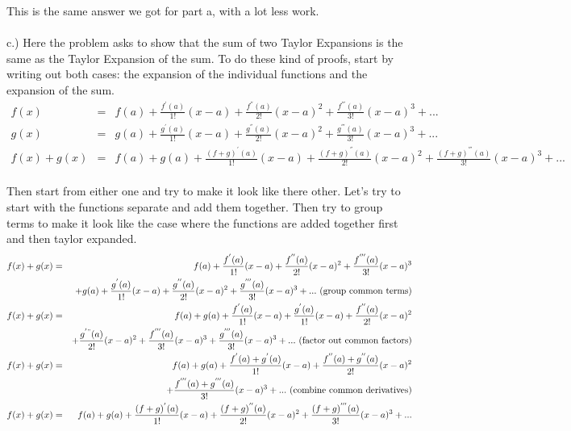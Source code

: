 \documentclass[11pt]{amsart}
\begin{document}
This is the same answer we got for part a, with a lot less work. \\ \\ 
c.) Here the problem asks to show that the sum of two Taylor Expansions is the same as the Taylor Expansion of the sum. To do these kind of proofs, start by writing out both cases: the expansion of the individual functions and the expansion of the sum. \\
\begin{eqnarray} 
f(x) &=& f(a) + \frac{f^{'}(a)}{1!} (x-a) + \frac{f^{''}(a)}{2!}(x-a)^{2} + \frac{f^{'''}(a)}{3!}(x-a)^{3} + ... \nonumber \\
g(x) &=& g(a) + \frac{g^{'}(a)}{1!} (x-a) + \frac{g^{''}(a)}{2!}(x-a)^{2} + \frac{g^{'''}(a)}{3!}(x-a)^{3} + ... \nonumber \\
f(x) + g(x) &=& f(a) + g(a) + \frac{(f+g)^{'}(a)}{1!} (x-a) + \frac{(f+g)^{''}(a)}{2!}(x-a)^{2} + \frac{(f+g)^{'''}(a)}{3!}(x-a)^{3} + ... \nonumber
\end{eqnarray} \\
Then start from either one and try to make it look like there other. Let's try to start with the functions separate and add them together. Then try to group terms to make it look like the case where the functions are added together first and then taylor expanded. \\ 
\begin{eqnarray*} 
f(x) + g(x) &=& f(a) + \frac{f^{'}(a)}{1!} (x-a) + \frac{f^{''}(a)}{2!}(x-a)^{2} + \frac{f^{'''}(a)}{3!}(x-a)^{3}  \\ 
                 & & +  g(a) + \frac{g^{'}(a)}{1!} (x-a) + \frac{g^{''}(a)}{2!}(x-a)^{2} + \frac{g^{'''}(a)}{3!}(x-a)^{3} + ...  \mbox{ (group common terms)}  \\ 
f(x) + g(x)  &=& f(a) + g(a) + \frac{f^{'}(a)}{1!} (x-a) + \frac{g^{'}(a)}{1!} (x-a) + \frac{f^{''}(a)}{2!}(x-a)^{2} \\
                  & & + \frac{g^{'"}(a)}{2!} (x-a)^{2} + \frac{f^{'''}(a)}{3!}(x-a)^{3} + \frac{g^{'''}(a)}{3!}(x-a)^{3} + ... \mbox{ (factor out common factors)}  \\
f(x) +g(x)  &=& f(a) + g(a) +  \frac{f^{'}(a) + g^{'}(a)}{1!} (x-a) + \frac{f^{''}(a) + g^{''}(a)}{2!}(x-a)^{2} \\
                 & &+ \frac{f^{'''}(a) + g^{'''}(a)}{3!}(x-a)^{3} + ... \mbox{ (combine  common derivatives)}  \\
f(x) + g(x)  &=& f(a) + g(a) +  \frac{(f+g)^{'}(a)}{1!} (x-a) + \frac{(f+g)^{''}(a)}{2!}(x-a)^{2} + \frac{(f+g)^{'''}(a)}{3!}(x-a)^{3} + ... 
\end{eqnarray*} \\
\end{document}
